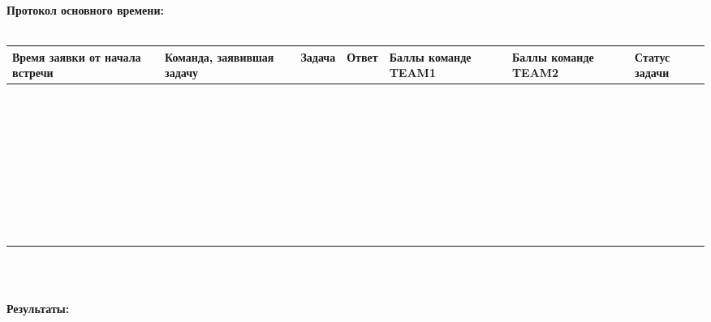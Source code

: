 \begin{center}

  {\large

    \textbf{Протокол основного времени:}\\

    \ \\

    \begin{tabular}{|p{2.5cm}|p{2.2cm}|p{2cm}|p{3cm}|p{2cm}|p{2cm}|p{2cm}|}

      \hline

      {\raggedright Время заявки от начала встречи} &
      {\raggedright Команда, заявившая задачу} &
      \centerline{Задача} & \centerline{Ответ} &
      {\raggedright Баллы команде TEAM1} & {\raggedright Баллы команде TEAM2} &
      {\raggedright Статус задачи} \\

      \hline

      \ & \ & \ & \ & \ & \ & \ \\
      \hline

      \ & \ & \ & \ & \ & \ & \ \\
      \hline

      \ & \ & \ & \ & \ & \ & \ \\
      \hline

      \ & \ & \ & \ & \ & \ & \ \\
      \hline

      \ & \ & \ & \ & \ & \ & \ \\
      \hline

      \ & \ & \ & \ & \ & \ & \ \\
      \hline

      \ & \ & \ & \ & \ & \ & \ \\
      \hline

      \ & \ & \ & \ & \ & \ & \ \\
      \hline

    \end{tabular}

  }

  \ \\
  \ \\

  {\large

    \textbf{Результаты:}\\

    \ \\

    \begin{tabular}{|r|c|c|}


\end{tabular}}
\end{center}
